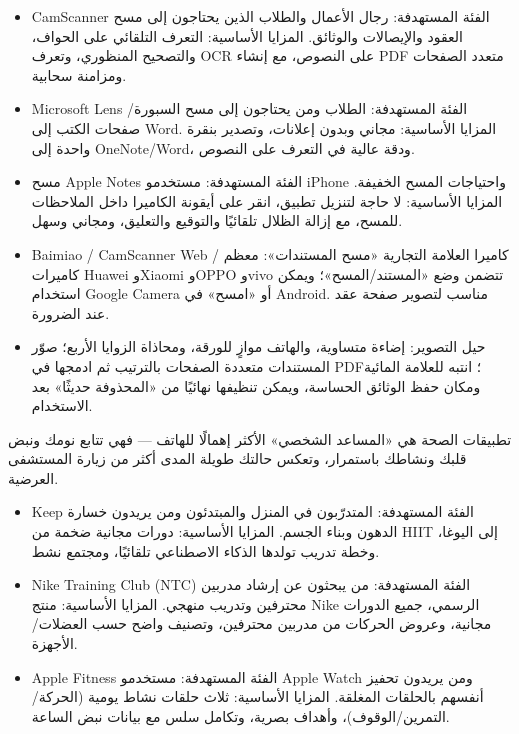 \begin{itemize}
  \item CamScanner الفئة المستهدفة: رجال الأعمال والطلاب الذين يحتاجون إلى مسح العقود والإيصالات والوثائق. المزايا الأساسية: التعرف التلقائي على الحواف، والتصحيح المنظوري، وتعرف OCR على النصوص، مع إنشاء PDF متعدد الصفحات ومزامنة سحابية.
  \item Microsoft Lens الفئة المستهدفة: الطلاب ومن يحتاجون إلى مسح السبورة/صفحات الكتب إلى Word. المزايا الأساسية: مجاني وبدون إعلانات، وتصدير بنقرة واحدة إلى OneNote/Word، ودقة عالية في التعرف على النصوص.
  \item مسح Apple Notes الفئة المستهدفة: مستخدمو iPhone واحتياجات المسح الخفيفة. المزايا الأساسية: لا حاجة لتنزيل تطبيق، انقر على أيقونة الكاميرا داخل الملاحظات للمسح، مع إزالة الظلال تلقائيًا والتوقيع والتعليق، ومجاني وسهل.
  \item Baimiao / CamScanner Web / كاميرا العلامة التجارية «مسح المستندات»: معظم كاميرات Huawei وXiaomi وOPPO وvivo تتضمن وضع «المستند/المسح»؛ ويمكن استخدام Google Camera أو «امسح» في Android. مناسب لتصوير صفحة عقد عند الضرورة.
  \item حيل التصوير: إضاءة متساوية، والهاتف موازٍ للورقة، ومحاذاة الزوايا الأربع؛ صوّر المستندات متعددة الصفحات بالترتيب ثم ادمجها في PDF؛ انتبه للعلامة المائية ومكان حفظ الوثائق الحساسة، ويمكن تنظيفها نهائيًا من «المحذوفة حديثًا» بعد الاستخدام.
\end{itemize}


تطبيقات الصحة هي «المساعد الشخصي» الأكثر إهمالًا للهاتف — فهي تتابع نومك ونبض قلبك ونشاطك باستمرار، وتعكس حالتك طويلة المدى أكثر من زيارة المستشفى العرضية.


\begin{itemize}
  \item Keep الفئة المستهدفة: المتدرّبون في المنزل والمبتدئون ومن يريدون خسارة الدهون وبناء الجسم. المزايا الأساسية: دورات مجانية ضخمة من HIIT إلى اليوغا، وخطة تدريب تولدها الذكاء الاصطناعي تلقائيًا، ومجتمع نشط.
  \item Nike Training Club (NTC) الفئة المستهدفة: من يبحثون عن إرشاد مدربين محترفين وتدريب منهجي. المزايا الأساسية: منتج Nike الرسمي، جميع الدورات مجانية، وعروض الحركات من مدربين محترفين، وتصنيف واضح حسب العضلات/الأجهزة.
  \item Apple Fitness الفئة المستهدفة: مستخدمو Apple Watch ومن يريدون تحفيز أنفسهم بالحلقات المغلقة. المزايا الأساسية: ثلاث حلقات نشاط يومية (الحركة/التمرين/الوقوف)، وأهداف بصرية، وتكامل سلس مع بيانات نبض الساعة.
\end{itemize}

